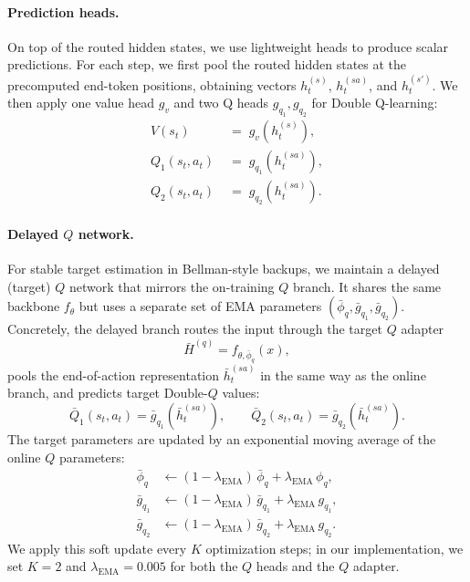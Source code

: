 \paragraph{Prediction heads.}
On top of the routed hidden states, we use lightweight heads to produce scalar predictions.
For each step, we first pool the routed hidden states at the precomputed end-token positions, obtaining vectors $h_t^{(s)}$, $h_t^{(sa)}$, and $h_t^{(s')}$.
We then apply one value head $g_v$ and two Q heads $g_{q_1}, g_{q_2}$ for Double Q-learning:
\begin{equation}
\begin{aligned}
V(s_t) \; &=\; g_v\!\left(h_t^{(s)}\right), \\
Q_1(s_t,a_t) \; &=\; g_{q_1}\!\left(h_t^{(sa)}\right), \\
Q_2(s_t,a_t) \; &=\; g_{q_2}\!\left(h_t^{(sa)}\right).
\end{aligned}
\label{eq:critic-heads}
\end{equation}


\paragraph{Delayed $Q$ network.}
For stable target estimation in Bellman-style backups, we maintain a delayed (target) $Q$ network that mirrors the on-training $Q$ branch.
It shares the same backbone $f_\theta$ but uses a separate set of EMA parameters $(\bar\phi_q,\bar g_{q_1}, \bar g_{q_2})$.
Concretely, the delayed branch routes the input through the target $Q$ adapter
\begin{equation}
\bar H^{(q)} = f_{\theta,\bar\phi_q}(x),
\label{eq:delayed-q-routing}
\end{equation}
pools the end-of-action representation $\bar h_t^{(sa)}$ in the same way as the online branch, and predicts target Double-$Q$ values:
\begin{equation}
\bar Q_1(s_t,a_t)=\bar g_{q_1}\!\left(\bar h_t^{(sa)}\right), \qquad
\bar Q_2(s_t,a_t)=\bar g_{q_2}\!\left(\bar h_t^{(sa)}\right).
\label{eq:delayed-q-heads}
\end{equation}
The target parameters are updated by an exponential moving average of the online $Q$ parameters:
\begin{equation}
\begin{aligned}
\bar\phi_q &\leftarrow (1-\lambda_{\text{EMA}})\,\bar\phi_q + \lambda_{\text{EMA}}\,\phi_q,\\
\bar g_{q_1} &\leftarrow (1-\lambda_{\text{EMA}})\,\bar g_{q_1} + \lambda_{\text{EMA}}\, g_{q_1},\\
\bar g_{q_2} &\leftarrow (1-\lambda_{\text{EMA}})\,\bar g_{q_2} + \lambda_{\text{EMA}}\, g_{q_2}.
\end{aligned}
\label{eq:ema-delayed-q}
\end{equation}
We apply this soft update every $K$ optimization steps; in our implementation, we set $K=2$ and $\lambda_{\text{EMA}}=0.005$ for both the $Q$ heads and the $Q$ adapter.



